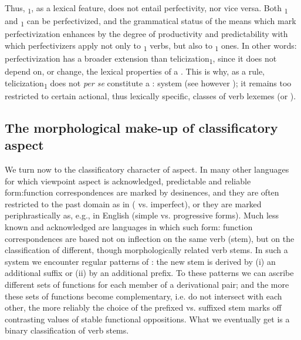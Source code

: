 \documentclass[output=paper]{langsci/langscibook}
\begin{document}
Thus, \textsubscript{1}, as a lexical feature, does not entail perfectivity, nor vice versa. Both \textsubscript{1} and \textsubscript{1}  can be perfectivized, and the grammatical status of the means which mark perfectivization enhances by the degree of productivity and predictability with which perfectivizers apply not only to \textsubscript{1} verbs, but also to \textsubscript{1} ones. In other words: perfectivization has a broader extension than telicization\textsubscript{1}, since it does not depend on, or change, the lexical properties of a . This is why, as a rule, telicization\textsubscript{1} does not \textit{per se} constitute a : system (see however ); it remains too restricted to certain actional, thus lexically specific, classes of verb lexemes (or ).

\subsection{The morphological make-up of classificatory aspect}\label{sec:wiemerserzant:2.4}

We turn now to the classificatory character of  aspect. In many other languages for which viewpoint aspect is acknowledged, predictable and reliable form:function correspondences are marked by  desinences, and they are often restricted to the past domain as in  ( vs. imperfect), or they are marked periphrastically as, e.g., in English (simple vs. progressive forms). Much less known and acknowledged are languages in which such form: function correspondences are based not on inflection on the same verb (stem), but on the classification of different, though morphologically related verb stems. In such a system we encounter regular patterns of : the new stem is derived by (i) an additional suffix or (ii) by an additional prefix. To these patterns we can ascribe different sets of functions for each member of a derivational pair; and the more these sets of functions become complementary, i.e.  do not intersect with each other, the more reliably the choice of the prefixed vs. suffixed stem marks off contrasting values of stable functional oppositions. What we eventually get is a binary classification of verb stems.
\end{document}
